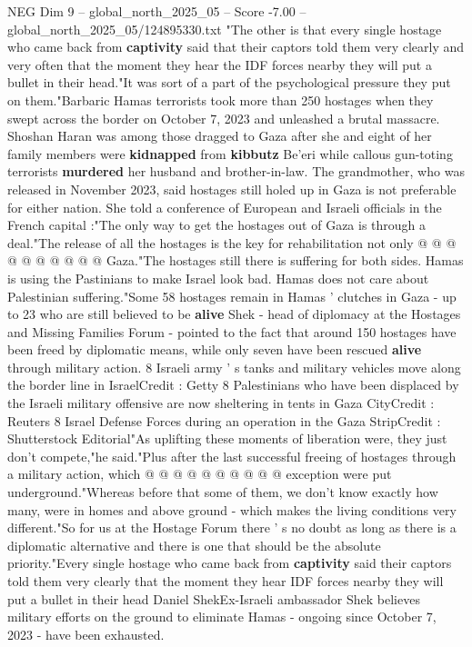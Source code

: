 \begin{textsample}{NEG Dim 9 – global\_north\_2025\_05 – Score -7.00 – global\_north\_2025\_05/124895330.txt}  \label{ex:f9_neg_172}
"The other is that every single hostage who came back from \textbf{captivity} said that their captors told them very clearly and very often that the moment they hear the IDF forces nearby they will put a bullet in their head."It was sort of a part of the psychological pressure they put on them."Barbaric Hamas terrorists took more than 250 hostages when they swept across the border on October 7, 2023 and unleashed a brutal massacre.
Shoshan Haran was among those dragged to Gaza after she and eight of her family members were \textbf{kidnapped} from \textbf{kibbutz} Be'eri while callous gun-toting terrorists \textbf{murdered} her husband and brother-in-law.
The grandmother, who was released in November 2023, said hostages still holed up in Gaza is not preferable for either nation.
She told a conference of European and Israeli officials in the French capital :"The only way to get the hostages out of Gaza is through a deal."The release of all the hostages is the key for rehabilitation not only @ @ @ @ @ @ @ @ @ @ Gaza."The hostages still there is suffering for both sides.
Hamas is using the Pastinians to make Israel look bad.
Hamas does not care about Palestinian suffering."Some 58 hostages remain in Hamas ' clutches in Gaza - up to 23 who are still believed to be \textbf{alive} Shek - head of diplomacy at the Hostages and Missing Families Forum - pointed to the fact that around 150 hostages have been freed by diplomatic means, while only seven have been rescued \textbf{alive} through military action. 8 Israeli army ' s tanks and military vehicles move along the border line in IsraelCredit : Getty 8 Palestinians who have been displaced by the Israeli military offensive are now sheltering in tents in Gaza CityCredit : Reuters 8 Israel Defense Forces during an operation in the Gaza StripCredit : Shutterstock Editorial"As uplifting these moments of liberation were, they just don't compete,"he said."Plus after the last successful freeing of hostages through a military action, which @ @ @ @ @ @ @ @ @ @ exception were put underground."Whereas before that some of them, we don't know exactly how many, were in homes and above ground - which makes the living conditions very different."So for us at the Hostage Forum there ' s no doubt as long as there is a diplomatic alternative and there is one that should be the absolute priority."Every single hostage who came back from \textbf{captivity} said their captors told them very clearly that the moment they hear IDF forces nearby they will put a bullet in their head Daniel ShekEx-Israeli ambassador Shek believes military efforts on the ground to eliminate Hamas - ongoing since October 7, 2023 - have been exhausted.

\end{textsample}
